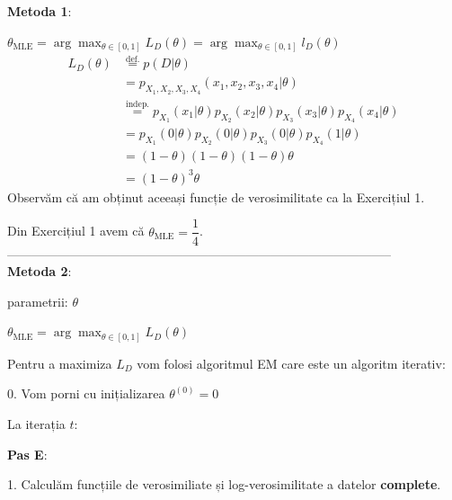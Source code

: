 \documentclass[12pt]{article}
\begin{document}
\begin{enumerate}
		\textbf{Metoda 1}:
		
		$\theta_\text{MLE} = \arg \max_{\theta \in [0,1]} L_D(\theta) = \arg \max_{\theta \in [0,1]} l_D(\theta)$
		\begin{align*}
		L_D(\theta) &\stackrel{\text{def.}}{=} p(D|\theta)\\
		&=p_{X_1,X_2,X_3,X_4}(x_1,x_2,x_3,x_4|\theta)\\
		&\stackrel{\text{indep.}}{=}p_{X_1}(x_1|\theta) p_{X_2}(x_2|\theta) p_{X_3}(x_3|\theta) p_{X_4}(x_4|\theta)\\
		&=p_{X_1}(0|\theta) p_{X_2}(0|\theta) p_{X_3}(0|\theta) p_{X_4}(1|\theta)\\
		&=(1-\theta)(1-\theta)(1-\theta)\theta\\
		&=(1-\theta)^3 \theta
		\end{align*}
		Observăm că am obținut aceeași funcție de verosimilitate ca la Exercițiul 1.
		
		Din Exercițiul 1 avem că $\theta_\text{MLE} = \dfrac{1}{4}$.
		\\--------------------------------------------------------------------------------------------\\
		\textbf{Metoda 2}:
		
		parametrii: $\theta$
		
		$\theta_\text{MLE} = \arg \max_{\theta \in[0,1]} L_D(\theta)$
		
		Pentru a maximiza $L_D$ vom folosi algoritmul EM care este un algoritm iterativ:
		
		0. Vom porni cu inițializarea $\theta^{(0)} = 0$
		
		La iterația $t$:
		
		\textbf{Pas E}:
		
		1. Calculăm funcțiile de verosimiliate și log-verosimilitate a datelor \textbf{complete}.
		

\end{enumerate}
\end{document}
